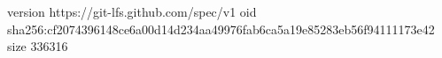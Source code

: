version https://git-lfs.github.com/spec/v1
oid sha256:cf2074396148ce6a00d14d234aa49976fab6ca5a19e85283eb56f94111173e42
size 336316
